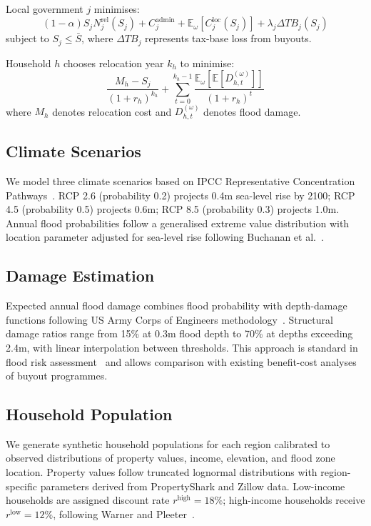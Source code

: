 \documentclass[11pt,letterpaper]{article}
\theoremstyle{definition}
\newcommand{\E}{\mathbb{E}}
\begin{document}
Local government $j$ minimises:
\begin{equation}
(1-\alpha) S_j N_j^{\text{rel}}(S_j) + C_j^{\text{admin}} + \E_\omega[C_j^{\text{loc}}(S_j)] + \lambda_j \Delta TB_j(S_j)
\end{equation}
subject to $S_j \leq \bar{S}$, where $\Delta TB_j$ represents tax-base loss from buyouts.

Household $h$ chooses relocation year $k_h$ to minimise:
\begin{equation}
\frac{M_h - S_j}{(1+r_h)^{k_h}} + \sum_{t=0}^{k_h-1} \frac{\E_\omega[\E[D_{h,t}^{(\omega)}]]}{(1+r_h)^t}
\end{equation}
where $M_h$ denotes relocation cost and $D_{h,t}^{(\omega)}$ denotes flood damage.

\subsection{Climate Scenarios}

We model three climate scenarios based on IPCC Representative Concentration Pathways~\cite{ipcc2019srocc}. RCP 2.6 (probability 0.2) projects 0.4m sea-level rise by 2100; RCP 4.5 (probability 0.5) projects 0.6m; RCP 8.5 (probability 0.3) projects 1.0m. Annual flood probabilities follow a generalised extreme value distribution with location parameter adjusted for sea-level rise following Buchanan et al.~\cite{buchanan2016allowances}.

\subsection{Damage Estimation}

Expected annual flood damage combines flood probability with depth-damage functions following US Army Corps of Engineers methodology~\cite{usace1992depth}. Structural damage ratios range from 15\% at 0.3m flood depth to 70\% at depths exceeding 2.4m, with linear interpolation between thresholds. This approach is standard in flood risk assessment~\cite{wing2018estimates} and allows comparison with existing benefit-cost analyses of buyout programmes.

\subsection{Household Population}

We generate synthetic household populations for each region calibrated to observed distributions of property values, income, elevation, and flood zone location. Property values follow truncated lognormal distributions with region-specific parameters derived from PropertyShark and Zillow data. Low-income households are assigned discount rate $r^{\text{high}} = 18\%$; high-income households receive $r^{\text{low}} = 12\%$, following Warner and Pleeter~\cite{warner2001personal}.
\end{document}

